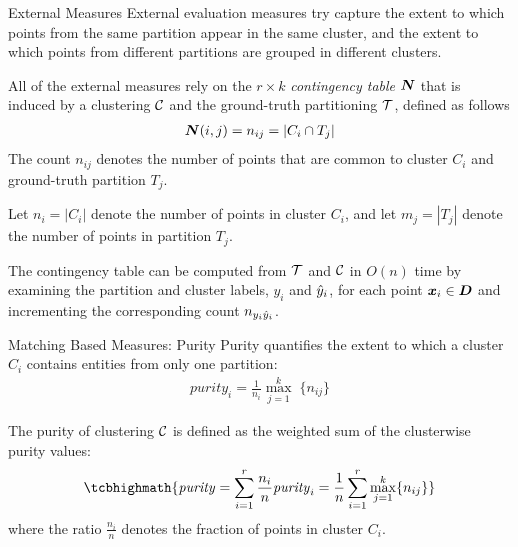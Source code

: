 \begin{frame}{External Measures}
External evaluation measures try
capture the extent to which points from the same partition appear in the
same cluster, and the extent to which points from different partitions
are grouped in different clusters. 

\medskip
All of the external measures rely on the $r\times k$
{\em contingency table} ${\boldsymbol N}$ that is
induced by a clustering ${\mathcal C}$ and the ground-truth partitioning ${\mathcal T}$, def\/{i}ned as follows
\begin{align*}
  {\boldsymbol N}(i,j) = n_{ij}  = \left| C_i \cap T_{j} \right|
\end{align*}
The count $n_{ij}$ denotes the number of points that are
common to cluster $C_i$ and ground-truth partition $T_{j}$.

\medskip
Let $n_{i} = |C_i|$ denote the number of points in cluster
$C_i$, and let $m_{j} = |T_{j}|$ denote the number of points in partition
$T_{j}$.  

\medskip
The contingency table can be computed from ${\mathcal T}$ and ${\mathcal C}$ in
$O(n)$ time by examining the partition and cluster labels, $y_i$ and
$\hat{y}_i$, for each point ${\boldsymbol x}_i \in {\boldsymbol D}$ and incrementing the
corresponding count $n_{y_i\hat{y}_i}$.
\end{frame}


\begin{frame}{Matching Based Measures: Purity}
Purity quantif\/{i}es the extent to which a
cluster $C_i$ contains entities from only one partition: 
\begin{align*}
  \mathit{purity}_i = \frac{1}{n_{i}}\max_{j=1}^k\; \{n_{ij}\}
\end{align*}

\bigskip
The purity of clustering ${\mathcal C}$ is def\/{i}ned as the weighted sum of the
clusterwise purity values:
\begin{align*}
\tcbhighmath{
  \mathit{purity} = \sum_{i=1}^r \frac{n_{i}}{n} \mathit{purity}_i =
  \frac{1}{n}\sum_{i=1}^r \max_{j=1}^k \{n_{ij}\}
}
\end{align*}
where the ratio $\tfrac{n_{i}}{n}$ denotes the fraction of points in
cluster $C_i$.  
\end{frame}


